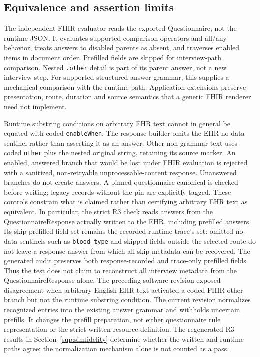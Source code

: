 \subsection{Equivalence and assertion limits}
The independent FHIR evaluator reads the exported Questionnaire, not the runtime
JSON. It evaluates supported comparison operators and all/any behavior, treats
answers to disabled parents as absent, and traverses enabled items in document
order. Prefilled fields are skipped for interview-path comparison. Nested
\texttt{.other} detail is part of its parent answer, not a new interview step.
For supported structured answer grammar, this supplies a mechanical comparison
with the runtime path. Application extensions preserve presentation, route,
duration and source semantics that a generic FHIR renderer need not implement.

Runtime substring conditions on arbitrary EHR text cannot in general be equated
with coded \texttt{enableWhen}. The response builder omits the EHR no-data sentinel
rather than asserting it as an answer. Other non-grammar text uses coded
\texttt{other} plus the nested original string, retaining its source marker.
An enabled, answered branch that would be lost under FHIR evaluation is rejected
with a sanitized, non-retryable unprocessable-content response. Unanswered branches
do not create answers. A pinned questionnaire canonical is checked before writing;
legacy records without the pin are explicitly tagged. These controls constrain
what is claimed rather than certifying arbitrary EHR text as equivalent.
In particular, the strict R3 check reads answers from the QuestionnaireResponse
actually written to the EHR, including prefilled answers. Its skip-prefilled
field set remains the recorded runtime trace's set: omitted no-data sentinels
such as \texttt{blood\_type} and skipped fields outside the selected route do
not leave a response answer from which all skip metadata can be recovered.
The generated audit preserves both response-recorded
and trace-only prefilled fields. Thus the test does not claim to reconstruct all
interview metadata from the QuestionnaireResponse alone. The preceding software
revision exposed disagreement when arbitrary English EHR text activated a coded
FHIR other branch but not the runtime substring condition. The current revision
normalizes recognized entries into the existing answer grammar and withholds
uncertain prefills. It changes the prefill preparation, not either questionnaire
rule representation or the strict written-resource definition. The regenerated
R3 results in Section~\ref{sup:simfidelity} determine whether the written and
runtime paths agree; the normalization mechanism alone is not counted as a pass.


